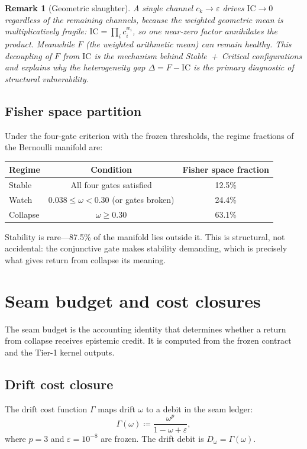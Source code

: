 \documentclass[
  aps,
  prd,
  preprint,
  superscriptaddress,
  nofootinbib,
  floatfix
]{revtex4-2}
\newcommand{\IC}{\mathrm{IC}}
\newtheorem{remark}{Remark}
\begin{document}
\begin{remark}[Geometric slaughter]
\label{rem:geometric_slaughter}
A single channel $c_k \to \varepsilon$ drives $\IC \to 0$ regardless of the remaining channels, because the
weighted geometric mean is multiplicatively fragile: $\IC = \prod_i c_i^{w_i}$, so one near-zero factor
annihilates the product. Meanwhile $F$ (the weighted arithmetic mean) can remain healthy.
This decoupling of $F$ from $\IC$ is the mechanism behind Stable~+~Critical configurations and
explains why the heterogeneity gap $\Delta = F - \IC$ is the primary diagnostic of structural vulnerability.
\end{remark}

\subsection{Fisher space partition}
Under the four-gate criterion with the frozen thresholds, the regime fractions of the Bernoulli manifold are:
\begin{center}
\begin{tabular}{@{}lcc@{}}
\toprule
Regime & Condition & Fisher space fraction \\
\midrule
Stable & All four gates satisfied & 12.5\% \\
Watch & $0.038 \le \omega < 0.30$ (or gates broken) & 24.4\% \\
Collapse & $\omega \ge 0.30$ & 63.1\% \\
\bottomrule
\end{tabular}
\end{center}
Stability is rare---87.5\% of the manifold lies outside it. This is structural, not accidental:
the conjunctive gate makes stability demanding, which is precisely what gives return from collapse its meaning.

\section{Seam budget and cost closures}
\label{sec:seam_budget}

The seam budget is the accounting identity that determines whether a return from collapse receives epistemic credit.
It is computed from the frozen contract and the Tier-1 kernel outputs.

\subsection{Drift cost closure}
The drift cost function $\Gamma$ maps drift $\omega$ to a debit in the seam ledger:
\begin{equation}
  \Gamma(\omega) \coloneqq \frac{\omega^p}{1-\omega+\varepsilon},
\end{equation}
where $p=3$ and $\varepsilon=10^{-8}$ are frozen. The drift debit is $D_\omega = \Gamma(\omega)$.
\end{document}
